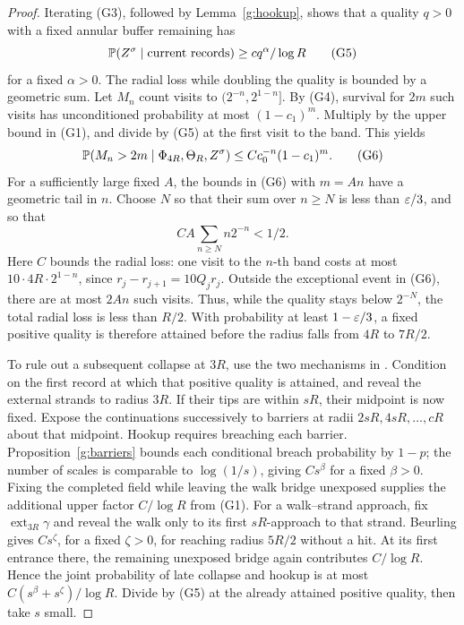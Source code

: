 \begin{proof}
Iterating (G3), followed by Lemma~\ref{g:hookup}, shows that a quality
\(q>0\) with a fixed annular buffer remaining has
\[
 \mathbb P(Z^\sigma\mid\hbox{current records})
       \geq c q^\alpha/\log R                         \tag{G5}
\]
for a fixed \(\alpha>0\). The radial loss while doubling the quality
is bounded by a geometric sum. Let \(M_n\) count visits to
\((2^{-n},2^{1-n}]\). By (G4), survival for \(2m\) such visits has
unconditioned probability at most \((1-c_1)^m\).
Multiply by the upper bound in (G1), and divide by (G5) at the first
visit to the band. This yields
\[
 \mathbb P(M_n>2m\mid\Phi_{4R},\Theta_R,Z^\sigma)
       \leq C c_0^{-n}(1-c_1)^m.                     \tag{G6}
\]
For a sufficiently large fixed \(A\), the bounds in (G6) with
\(m=An\) have a geometric tail in \(n\). Choose \(N\) so that their
sum over \(n\ge N\) is less than \(\varepsilon/3\), and so that
\[
 C A\sum_{n\ge N}n2^{-n}<1/2.
\]
Here \(C\) bounds the radial loss: one visit to the \(n\)-th band
costs at most \(10\cdot4R\cdot2^{1-n}\), since
\(r_j-r_{j+1}=10Q_jr_j\). Outside the exceptional event in (G6),
there are at most \(2An\) such visits. Thus, while the quality stays
below \(2^{-N}\), the total radial loss is less than \(R/2\).
With probability at least \(1-\varepsilon/3\), a fixed positive quality is
therefore attained before the radius falls from \(4R\) to \(7R/2\).

To rule out a subsequent collapse at \(3R\), use the two mechanisms
in \cite[proof of Lemma~3.15, equations (3.40)--(3.42)]{SSdiscrete}.
Condition on the first record at which that positive quality is attained,
and reveal the external strands to radius \(3R\). If their tips are within \(sR\), their midpoint is
now fixed. Expose the continuations successively to barriers at radii
\(2sR,4sR,\ldots,cR\) about that midpoint. Hookup requires
breaching each barrier. Proposition~\ref{g:barriers} bounds each
conditional breach probability by \(1-p\); the number of scales is comparable to
\(\log(1/s)\), giving
\(Cs^\beta\) for a fixed \(\beta>0\). Fixing the completed field while leaving the walk bridge
unexposed supplies the additional upper factor \(C/\log R\) from (G1).
For a walk--strand approach, fix \(\operatorname{ext}_{3R}\gamma\)
and reveal the walk only to its first \(sR\)-approach to that strand.
Beurling gives \(Cs^\zeta\), for a fixed \(\zeta>0\), for reaching radius
\(5R/2\) without a hit. At its first entrance there, the remaining
unexposed bridge again contributes \(C/\log R\). Hence the joint probability of late collapse and hookup
is at most \(C(s^\beta+s^\zeta)/\log R\). Divide by (G5) at the
already attained positive quality, then take \(s\) small.


\end{proof}
